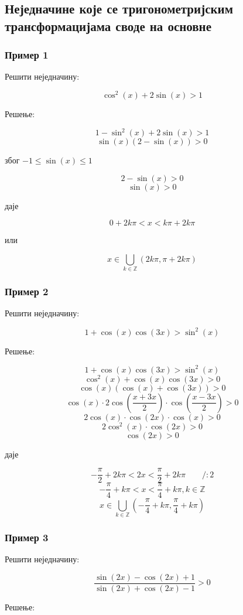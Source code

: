 \documentclass[../diplomski.tex]{subfiles}
\begin{document}
\subsection{Неједначине које се тригонометријским трансформацијама своде на основне}

\subsubsection{Пример 1}

Решити неједначину:

\[\cos^{2}(x)+2\sin(x)>1\]

Решење:



\[1-\sin^{2}(x)+2\sin(x)>1\]
\[\sin(x)(2-\sin(x))>0\]
\centerline{због $-1\le\sin(x)\le1$}
\[2-\sin(x)>0\]
\[\sin(x)>0\]
\centerline{даје}
\[0+2k\pi<x<k\pi+2k\pi\]
\centerline{или}
\[x\in\bigcup_{k\in\mathbb{Z}}(2k\pi,\pi+2k\pi)\]

\subsubsection{Пример 2}

Решити неједначину:

\[1+\cos(x)\cos(3x)>\sin^{2}(x)\]

Решење:



\[1+\cos(x)\cos(3x)>\sin^{2}(x)\]
\[\cos^{2}(x)+\cos(x)\cos(3x)>0\]
\[\cos(x)(\cos(x)+\cos(3x))>0\]
\[\cos(x)\cdot2\cos\left(\frac{x+3x}{2}\right)\cdot\cos\left(\frac{x-3x}{2}\right)>0\]
\[2\cos(x)\cdot\cos(2x)\cdot\cos(x)>0\]
\[2\cos^{2}(x)\cdot\cos(2x)>0\]
\[\cos(2x)>0\]
\centerline{даје}
\[-\frac{\pi}{2}+2k\pi<2x<\frac{\pi}{2}+2k\pi\qquad/:2\]
\[-\frac{\pi}{4}+k\pi<x<\frac{\pi}{4}+k\pi,k\in\mathbb{Z}\]
\[x\in\bigcup_{k\in\mathbb{Z}}\left(-\frac{\pi}{4}+k\pi,\frac{\pi}{4}+k\pi\right)\]


\subsubsection{Пример 3}

Решити неједначину:

\[\frac{\sin(2x)-\cos(2x)+1}{\sin(2x)+\cos(2x)-1}>0\]

Решење:
\end{document}

